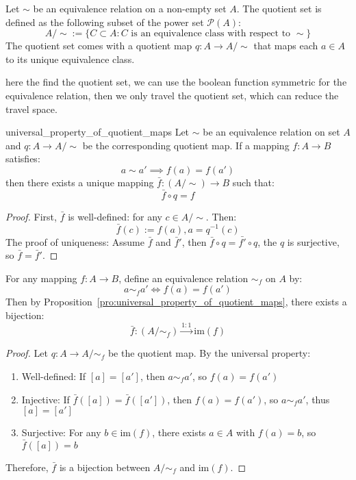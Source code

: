 \begin{definition}
  Let $\sim$ be an equivalence relation on a non-empty set $A$. The quotient set is defined as the following subset of the power set $\mathcal{P}(A)$:
  \[
    A/{\sim} := \{C \subset A : C \text{ is an equivalence class with respect to } \sim\}
  \]
  The quotient set comes with a quotient map $q: A \to A/{\sim}$ that maps each $a \in A$ to its unique equivalence class.
\end{definition}

\begin{remark}
  here the find the quotient set, we can use the boolean function symmetric for the equivalence relation, then we only travel the quotient set, which can reduce the travel space.
\end{remark}

\begin{proposition}{universal_property_of_quotient_maps}
  Let $\sim$ be an equivalence relation on set $A$ and $q: A \to A/{\sim}$ be the corresponding quotient map. If a mapping $f: A \to B$ satisfies:
  \[
    a \sim a' \implies f(a) = f(a')
  \]
  then there exists a unique mapping $\bar{f}: (A/{\sim}) \to B$ such that:
  \[
    \bar{f} \circ q = f
  \]
\end{proposition}

\begin{proof}
  First, $\bar{f}$ is well-defined: for any $c \in A/{\sim}$. Then:
  \[
    \bar{f}(c) := f(a), a = q^{-1}(c)
  \]
  The proof of uniqueness: Assume $\bar{f}$ and $\bar{f}'$, then $\bar{f}\circ q=\bar{f'} \circ q$, the $q$ is surjective, so $\bar{f}=\bar{f}'$.
\end{proof}

\begin{proposition}
  For any mapping $f : A \to B$, define an equivalence relation $\sim_f$ on $A$ by:
  \[
    a \sim_f a' \iff f(a) = f(a')
  \]
  Then by Proposition~\ref{pro:universal_property_of_quotient_maps}, there exists a bijection:
  \[
    \bar{f} : (A/{\sim_f}) \xrightarrow{1:1} \text{im}(f)
  \]
\end{proposition}

\begin{proof}
  Let $q: A \to A/{\sim_f}$ be the quotient map. By the universal property:
  \begin{enumerate}
    \item Well-defined: If $[a] = [a']$, then $a \sim_f a'$, so $f(a) = f(a')$

    \item Injective: If $\bar{f}([a]) = \bar{f}([a'])$, then $f(a) = f(a')$,
      so $a \sim_f a'$, thus $[a] = [a']$

    \item Surjective: For any $b \in \text{im}(f)$, there exists $a \in A$
      with $f(a) = b$, so $\bar{f}([a]) = b$
  \end{enumerate}
  Therefore, $\bar{f}$ is a bijection between $A/{\sim_f}$ and $\text{im}(f)$.
\end{proof}

